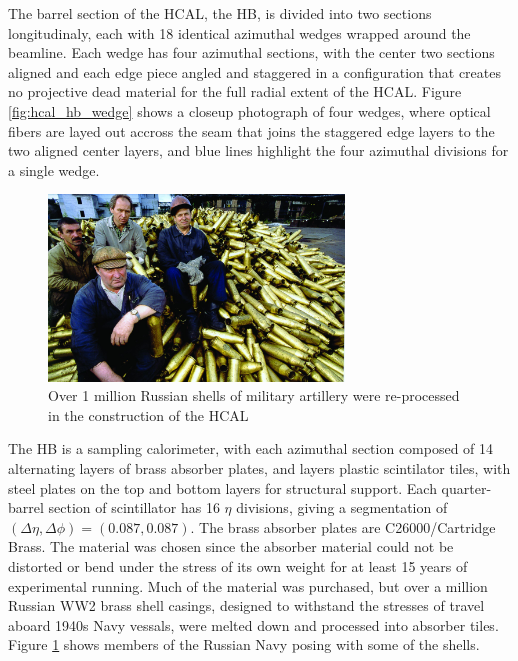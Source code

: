 \par The barrel section of the HCAL, the HB, is divided into two
sections longitudinaly, each with 18 identical azimuthal wedges
wrapped around the beamline.  Each wedge has four azimuthal sections,
with the center two sections aligned and each edge piece angled and
staggered in a configuration that creates no projective dead material
for the full radial extent of the HCAL.  Figure
\ref{fig:hcal_hb_wedge} shows a closeup photograph of four wedges,
where optical fibers are layed out accross the seam that joins the
staggered edge layers to the two aligned center layers, and blue lines
highlight the four azimuthal divisions for a single wedge.  

\begin{figure}[h]
   \centering
  \includegraphics[width=0.7\textwidth]{Figures/CMS_Diagrams/HCAL__NavyShells.jpg}
  \caption{Over 1 million Russian shells of military artillery were
    re-processed in the construction of the HCAL} \label{fig:hcal_navy_shells}
\end{figure}

\par The HB is a sampling calorimeter, with each azimuthal section
composed of 14 alternating layers of brass absorber plates, and layers
plastic scintilator tiles, with steel plates on the top and bottom
layers for structural support.  Each quarter-barrel section of
scintillator has 16 $\eta$ divisions, giving a segmentation of
$(\Delta\eta, \Delta\phi) = (0.087, 0.087)$.  The brass absorber
plates are C26000/Cartridge Brass.  The material was chosen since the
absorber material could not be distorted or bend under the stress of
its own weight for at least 15 years of experimental running.  Much of
the material was purchased, but over a million Russian WW2 brass shell
casings, designed to withstand the stresses of travel aboard 1940s
Navy vessals, were melted down and processed into absorber tiles.
Figure \ref{fig:hcal_navy_shells} shows members of the Russian Navy
posing with some of the shells. 

